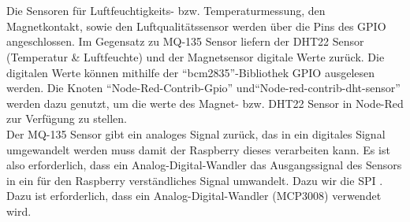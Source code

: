 \\\\
Die Sensoren für Luftfeuchtigkeits- bzw. Temperaturmessung, den Magnetkontakt, sowie den Luftqualitätssensor werden über die Pins des \ac{GPIO} angeschlossen. Im Gegensatz zu MQ-135 Sensor liefern der DHT22 Sensor (Temperatur \& Luftfeuchte) und der Magnetsensor digitale Werte zurück. Die digitalen Werte können mithilfe der \enquote{bcm2835}-Bibliothek \ac{GPIO} ausgelesen werden\cite{bcm:Bcm}. Die Knoten \enquote{Node-Red-Contrib-Gpio}\cite{node:GPIO} und\enquote{Node-red-contrib-dht-sensor}\cite{node:DHT22} werden dazu genutzt, um die werte des Magnet- bzw. DHT22 Sensor in Node-Red zur Verfügung zu stellen. 
\\Der MQ-135 Sensor gibt ein analoges Signal zurück, das in ein digitales Signal umgewandelt werden muss damit der Raspberry dieses verarbeiten kann. Es ist also erforderlich, dass ein Analog-Digital-Wandler das Ausgangssignal des Sensors in ein für den Raspberry verständliches Signal umwandelt. Dazu wir die \ac{SPI} . Dazu ist erforderlich, dass ein Analog-Digital-Wandler (MCP3008) verwendet wird. 

